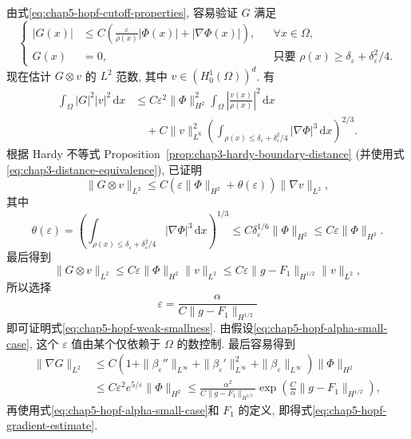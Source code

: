 \begin{Proof}
由式\eqref{eq:chap5-hopf-cutoff-properties}, 容易验证 $G$ 满足
\[
 \left\{
 \begin{aligned}
 |G(x)|&\leq C\left(\frac\varepsilon{\rho(x)}|\Phi(x)|+|\nabla\Phi(x)|\right),
 &&\forall x\in\Omega,\\
 G(x)&=0,
 &&\text{只要 }\rho(x)\geq\delta_\varepsilon+\delta_\varepsilon^2/4.
 \end{aligned}
 \right.
\]
现在估计 $G\otimes v$ 的 $L^2$ 范数, 其中 $v\in(H_0^1(\Omega))^d$. 有
\begin{align*}
 \int_\Omega|G|^2|v|^2\,\mathrm dx
 &\leq C\varepsilon^2\|\Phi\|_{H^2}^2
 \int_\Omega\left|\frac{v(x)}{\rho(x)}\right|^2\,\mathrm dx\\
 &\quad+C\|v\|_{L^6}^2
 \left(\int_{\rho(x)\leq\delta_\varepsilon+\delta_\varepsilon^2/4}
 |\nabla\Phi|^3\,\mathrm dx\right)^{2/3}.
\end{align*}
根据 Hardy 不等式 Proposition~\ref{prop:chap3-hardy-boundary-distance} (并使用式\eqref{eq:chap3-distance-equivalence}), 已证明
\[
 \|G\otimes v\|_{L^2}
 \leq C\left(\varepsilon\|\Phi\|_{H^2}+\theta(\varepsilon)\right)
 \|\nabla v\|_{L^2},
\]
其中
\[
 \theta(\varepsilon)
 =\left(\int_{\rho(x)\leq\delta_\varepsilon+\delta_\varepsilon^2/4}
 |\nabla\Phi|^3\,\mathrm dx\right)^{1/3}
 \leq C\delta_\varepsilon^{1/6}\|\Phi\|_{H^2}
 \leq C\varepsilon\|\Phi\|_{H^2}.
\]
最后得到
\[
 \|G\otimes v\|_{L^2}
 \leq C\varepsilon\|\Phi\|_{H^2}\|v\|_{L^2}
 \leq C\varepsilon\|g-F_1\|_{H^{1/2}}\|v\|_{L^2},
\]
所以选择
\[
 \varepsilon=\frac\alpha{C\|g-F_1\|_{H^{1/2}}}
\]
即可证明式\eqref{eq:chap5-hopf-weak-smallness}. 由假设\eqref{eq:chap5-hopf-alpha-small-case}, 这个 $\varepsilon$ 值由某个仅依赖于 $\Omega$ 的数控制. 最后容易得到
\begin{align*}
 \|\nabla G\|_{L^2}
 &\leq C\left(1+\|\beta_\varepsilon''\|_{L^\infty}
 +\|\beta_\varepsilon'\|_{L^\infty}^2
 +\|\beta_\varepsilon\|_{L^\infty}\right)\|\Phi\|_{H^2}\\
 &\leq C\varepsilon^2e^{5/\varepsilon}\|\Phi\|_{H^2}
 \leq\frac{\alpha^2}{C\|g-F_1\|_{H^{1/2}}}
 \exp\!\left(\frac C\alpha\|g-F_1\|_{H^{1/2}}\right),
\end{align*}
再使用式\eqref{eq:chap5-hopf-alpha-small-case}和 $F_1$ 的定义, 即得式\eqref{eq:chap5-hopf-gradient-estimate}.
\end{Proof}

